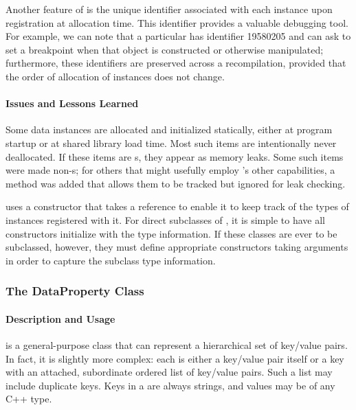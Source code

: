 Another feature of  is the unique identifier associated with each
instance upon registration at allocation time.  This identifier provides
a valuable debugging tool.  For example, we can note that a particular
 has identifier 19580205 and can ask to set a
breakpoint when that object is constructed or otherwise manipulated;
furthermore, these identifiers are preserved across a recompilation,
provided that the order of allocation of instances does not change.

\paragraph{Issues and Lessons Learned}

Some data instances are allocated and initialized statically, either at
program startup or at shared library load time.  Most such items are intentionally
never deallocated.  If these items are s, they appear as memory
leaks.  Some such items were made non-s; for others that might
usefully employ 's other capabilities, a 
method was added that allows them to be tracked but ignored for leak
checking.

 uses a constructor that takes a  reference
to enable it to keep track of the types of instances registered with it.
For direct subclasses of , it is simple to have all constructors
initialize  with the type information.  If these classes are ever
to be subclassed, however, they must define appropriate constructors
taking  arguments in order to capture the subclass
type information.

\subsubsection{The DataProperty Class}
\label{DataProperty}

\paragraph{Description and Usage}

 is a general-purpose class that can represent a
hierarchical set of key/value pairs.  In fact, it is slightly more
complex: each  is either a key/value pair itself or a key
with an attached, subordinate ordered list of key/value pairs.  Such a
list may include duplicate keys.  Keys in a  are always
strings, and values may be of any C++ type.

